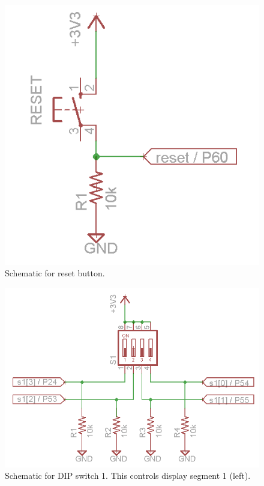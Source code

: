 \documentclass[11pt]{article}
\begin{document}
\begin{figure}[h!]
\centering
\includegraphics[scale=0.54]{reset.png}
\caption{Schematic for reset button.}
\label{fig:reset_sch}
\end{figure} 


\begin{figure}[h!]
\centering
\includegraphics[scale=0.54]{s1.png}
\caption{Schematic for DIP switch 1. This controls display segment 1 (left).}
\label{fig:s1_sch}
\end{figure} 
\end{document}
